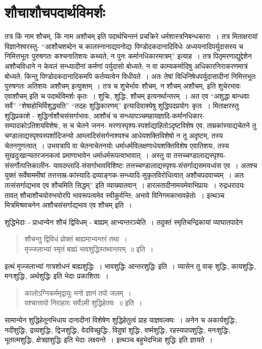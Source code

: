 {\section*{शौचाशौचपदार्थविमर्शः}

तत्र किं नाम शौचम्, किं नाम अशौचम् इति पदार्थचिन्तनं प्रचक्रिरे धर्मशास्त्रनिबन्धकाराः~। तत्र मिताक्षरायां विज्ञानेश्वरस्तु- “आशौचशब्देन च कालस्नानाद्यपनोद्यः पिण्डोदकदानादिविधेः अध्ययनादिपर्युदासस्य च निमित्तभूतः पुरुषगतः कश्चनातिशयः कथ्यते; न पुनः कर्मानधिकारमात्रम्” इत्याह~। तत्र पितृमरणाद्युद्देशेन अशौचविधाने न केवलं सन्ध्यादीनां कर्मणां पर्युदासो बोध्यते; न वा काम्यकर्मादिषु अधिकारनिराकरणमात्रं बोध्यते; किन्तु पिण्डोदकदानादिकमपि कर्तव्यत्वेन विधीयते~। अतः तेषां विधिनिषेधपर्युदासादीनां निमित्तभूतः पुरुषगतः अतिशयः अशौचम् इत्युक्तम्~। तत्र च शुचेर्भावः शौचम्, न शौचम् अशौचम्, इति शुचेरभावः एवाशौचम् इति च पदार्थविमर्शः कृतः~। शुचिः, शुद्धिः, शौचम् इत्यनर्थान्तरम्~। अत एव “अशुद्धा बान्धवाः सर्वे” “शेषाहोभिर्विशुद्ध्यति” “तदहः शुद्धिकारणम्” इत्यादिवाक्येषु शुद्धिपदप्रयोगः कृतः~। मिताक्षरस्तु शुद्धिप्रकाशे - शुद्धिर्नाशौचसंसर्गाभावः, आशौचं च सन्ध्यापञ्चमहायज्ञादि-कर्मानधिकार-सम्पादकोऽतिशयविशेषः, स च चेतने जनन- मरणास्पृश्य-स्पर्शाद्याहितोऽदृष्टविशेष एव, ताम्रकांस्याद्यचेतने तु चण्डालाद्यस्पृश्यस्पर्शादिजन्यो आम्लादिसंसर्गनाश्यश्च आधेयशक्तिविशेषो न तु अदृष्टम्, तस्य चेतनगुणत्वात्~। उभयत्रापि वा चेतनाचेतनयोः धर्माधर्मविलक्षणाधेयशक्तिविशेष एवातिशयः, तस्य सुखदुःखान्यतरजनकत्वं प्रमाणाभावेन धर्माधर्मरूपत्वाभावात्~। अस्तु वा तत्तच्चण्डालाद्यस्पृश्य-संसर्गोत्पत्तिकालीन- यावदम्लादि-संसर्गाभावविशिष्टः तत्तच्चण्डा\-\break लाद्यस्पृश्य-संसर्गाद्यसमयध्वंस एव~। अतश्च युक्तं सर्वेषाममीषां तत्तत्ताम्र-कांस्यादि-द्रव्या\-ङ्गक-सन्ध्यादि-सुकृतविरोधित्वात् अशौचपदवाच्यम्~। अतः तत्संसर्गाद्यभाव एव शौचमिति सिद्धम्” इति व्याख्यातवान्~। हारलतादीनामयमेवाभिप्रायः~। रुद्रधरादयः तावत् शौचाशौचयोरुभयोरपि भावरूपत्वमेव स्वीकुर्वन्ति; अभावे विनिगमकाभावहेतोः~।  इत्थञ्च मित्रमिश्रवचनेन अशौचसंसर्गाद्यभाव एव शौचम् इति~। 

शुद्धिभेदाः - प्राधान्येन शौचं द्विविधम् - बाह्यम् आभ्यन्तरञ्चेति~। तदुक्तं स्मृतिचन्द्रिकायां व्याघातपादेन 

\begin{verse}
शौचन्तु द्विविधं प्रोक्तं बाह्यमाभ्यन्तरं तथा~। \\
मृज्जलाभ्यां स्मृतं बाह्यं भावशुद्धिस्तथान्तरम्~॥ इति~। 
\end{verse}
इत्थं मृज्जलाभ्यां गात्रशोधनं बाह्यशुद्धिः~। भावशुद्धिः आन्तरशुद्धिः इति~। व्यासेन तु वाक् शुद्धिः, कायशुद्धिः, मनःशुद्धिः, अर्थशुद्धिः इति भेदाः प्रकाशिताः~। 
\begin{verse}
कालोऽग्निकर्ममृद्वायुः मनो ज्ञानं तपो जलम्~। \\
पश्चात्तापो निराहारः सर्वेऽमी शुद्धिहेतवः~॥ इति~। 
\end{verse}
सामान्येन शुद्धिहेतूनभिधाय दानादीनां विशेषेण शुद्धिहेतुत्वं प्राह याज्ञवल्क्यः~। अनेन च अकार्यशुद्धिः, नदीशुद्धिः, द्रव्यशुद्धिः, द्विजशुद्धिः, वेदविच्छुद्धिः, विदुषां शुद्धिः, वर्ष्मशुद्धिः, रहस्यपापशुद्धिः, मनःशुद्धिः, भूतात्मशुद्धिः, क्षेत्रज्ञशुद्धिः इति भेदाः लक्ष्यन्ते~।  इत्थञ्च बहुभेदभिन्ना शुद्धिः इति ज्ञायते~। 

}
